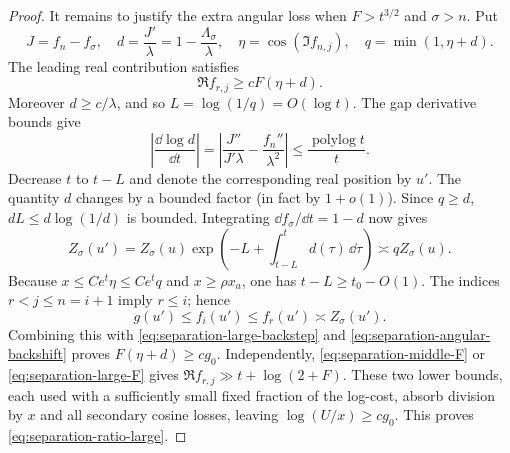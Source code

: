 \begin{proof}
It remains to justify the extra angular loss when $F>t^{3/2}$
and $\sigma>n$.  Put
\[
 J=f_n-f_\sigma,\quad
 d=\frac{J'}{\lambda}=1-\frac{\Lambda_\sigma}{\lambda},\quad
 \eta=\cos(\Im f_{n,j}),\quad q=\min(1,\eta+d).
\]
The leading real contribution satisfies
\begin{equation}\label{eq:separation-angular-F}
 \Re f_{r,j}\geq cF(\eta+d).
\end{equation}
Moreover $d\geq c/\lambda$, and so
$L=\log(1/q)=O(\log t)$.  The gap derivative bounds give
\begin{equation}\label{eq:separation-logd}
 \left|\frac{\dd\log d}{\dd t}\right|
 =\left|\frac{J''}{J'\lambda}
                    -\frac{f_n''}{\lambda^2}\right|
       \leq\frac{\operatorname{polylog}t}{t}.
\end{equation}
Decrease $t$ to $t-L$ and denote the corresponding real position
by $u'$.  The quantity $d$ changes by a bounded factor (in fact
by $1+o(1)$).  Since $q\geq d$,
$dL\leq d\log(1/d)$ is bounded.  Integrating
$\dd f_\sigma/\dd t=1-d$ now gives
\begin{equation}\label{eq:separation-angular-backshift}
 Z_\sigma(u')
  =Z_\sigma(u)
     \exp\!\left(-L+\int_{t-L}^{t}d(\tau)\,\dd\tau\right)
  \asymp qZ_\sigma(u).
\end{equation}
Because $x\leq Ce^t\eta\leq Ce^tq$ and
$x\geq\rho x_a$, one has $t-L\geq t_0-O(1)$.
The indices $r<j\leq n=i+1$ imply $r\leq i$; hence
\[
 g(u')\leq f_i(u')\leq f_r(u')\asymp Z_\sigma(u').
\]
Combining this with \eqref{eq:separation-large-backstep} and
\eqref{eq:separation-angular-backshift} proves
$F(\eta+d)\geq c g_0$.
Independently, \eqref{eq:separation-middle-F} or
\eqref{eq:separation-large-F} gives
$\Re f_{r,j}\gg t+\log(2+F)$.
These two lower bounds, each used with a sufficiently small
fixed fraction of the log-cost, absorb division by $x$ and all
secondary cosine losses, leaving $\log(U/x)\geq c g_0$.
This proves \eqref{eq:separation-ratio-large}.


\end{proof}
